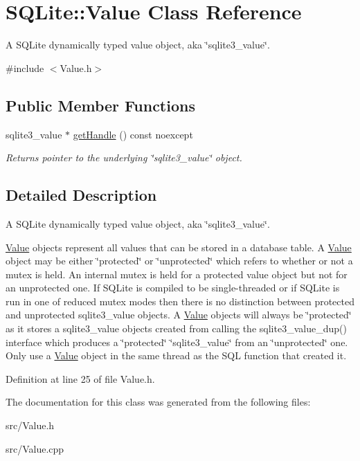 \hypertarget{a00010}{\section{S\-Q\-Lite\-:\-:Value Class Reference}
\label{a00010}
}


A S\-Q\-Lite dynamically typed value object, aka \char`\"{}sqlite3\-\_\-value\char`\"{}.  




{\ttfamily \#include $<$Value.\-h$>$}

\subsection*{Public Member Functions}
\begin{DoxyCompactItemize}
\item 
\hypertarget{a00010_adc0c8d347cbd6dbbd38c85ff755c9100}{sqlite3\-\_\-value $\ast$ \hyperlink{a00010_adc0c8d347cbd6dbbd38c85ff755c9100}{get\-Handle} () const noexcept}\label{a00010_adc0c8d347cbd6dbbd38c85ff755c9100}

\begin{DoxyCompactList}\small\item\em Returns pointer to the underlying \char`\"{}sqlite3\-\_\-value\char`\"{} object. \end{DoxyCompactList}\end{DoxyCompactItemize}


\subsection{Detailed Description}
A S\-Q\-Lite dynamically typed value object, aka \char`\"{}sqlite3\-\_\-value\char`\"{}. 

\hyperlink{a00010}{Value} objects represent all values that can be stored in a database table. A \hyperlink{a00010}{Value} object may be either \char`\"{}protected\char`\"{} or \char`\"{}unprotected\char`\"{} which refers to whether or not a mutex is held. An internal mutex is held for a protected value object but not for an unprotected one. If S\-Q\-Lite is compiled to be single-\/threaded or if S\-Q\-Lite is run in one of reduced mutex modes then there is no distinction between protected and unprotected sqlite3\-\_\-value objects. A \hyperlink{a00010}{Value} objects will always be \char`\"{}protected\char`\"{} as it stores a sqlite3\-\_\-value objects created from calling the sqlite3\-\_\-value\-\_\-dup() interface which produces a \char`\"{}protected\char`\"{} \char`\"{}sqlite3\-\_\-value\char`\"{} from an \char`\"{}unprotected\char`\"{} one. Only use a \hyperlink{a00010}{Value} object in the same thread as the S\-Q\-L function that created it. 

Definition at line 25 of file Value.\-h.



The documentation for this class was generated from the following files\-:\begin{DoxyCompactItemize}
\item 
src/Value.\-h\item 
src/Value.\-cpp\end{DoxyCompactItemize}
